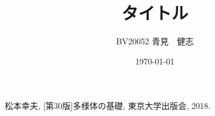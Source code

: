 \documentclass[titlepage, a4paper, 11pt, dvipdfmx]{jsarticle}
\title{\Huge タイトル}
\date{\today}
\author{\Large BV20052 \quad 青見　健志}
\begin{document}
\maketitle
{}
\tableofcontents
\newpage
{}



\begin{thebibliography}{1}
     松本幸夫, [第30版]多様体の基礎, 東京大学出版会, 2018.
\end{thebibliography}
\end{document}
